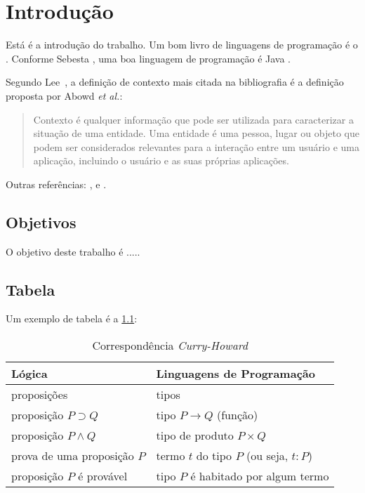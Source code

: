 \chapter{Introdução}
\label{chap:Introducao}

Está é a introdução do trabalho. Um bom livro de linguagens de programação é o \cite{Sebesta:2005}. 
Conforme Sebesta \citeyearpar{Sebesta:2005}, uma boa linguagem de programação é Java \cite{Sun:2010}.

Segundo Lee~\citeyearpar{Lee:2009}, a definição de contexto mais citada na bibliografia é a definição
proposta por Abowd \textit{et al.}:

\begin{quote}
         Contexto é qualquer informação que pode ser utilizada 
         para caracterizar a situação de uma entidade. Uma entidade é uma pessoa, lugar ou objeto que 
         podem ser considerados relevantes para a interação entre um usuário e uma aplicação, 
         incluindo o usuário e as suas próprias aplicações. \citep[tradução nossa]{Abowd:1999}
\end{quote}

Outras referências: \cite{Alex:2010}, \cite{Weiser:1991} e \cite{norell:thesis}.

\section{Objetivos}
O objetivo deste trabalho é .....

\section{Tabela}
Um exemplo de tabela é a \ref{tab:curry}:

\begin{table}[!hbt] %
   \centering   %
   \setlength{\arrayrulewidth}{1\arrayrulewidth}  %
   \setlength{\belowcaptionskip}{5pt}  %
   \caption{Correspondência \textit{Curry-Howard}}
   \begin{tabular}{l|l} %
      \hline
      \textbf{Lógica} & \textbf{Linguagens de Programação} \\
      \hline
      proposições & tipos  \\
      proposição $P \supset Q$ & tipo $P \rightarrow Q$ (função) \\
      proposição $P \wedge Q$ & tipo de produto $P \times Q$\\
      prova de uma proposição $P$ & termo $t$ do tipo $P$  (ou seja, $t:P$)\\
      proposição $P$ é provável & tipo $P$ é habitado por algum termo \\
      \hline
   \end{tabular}
   \label{tab:curry}
\end{table}

